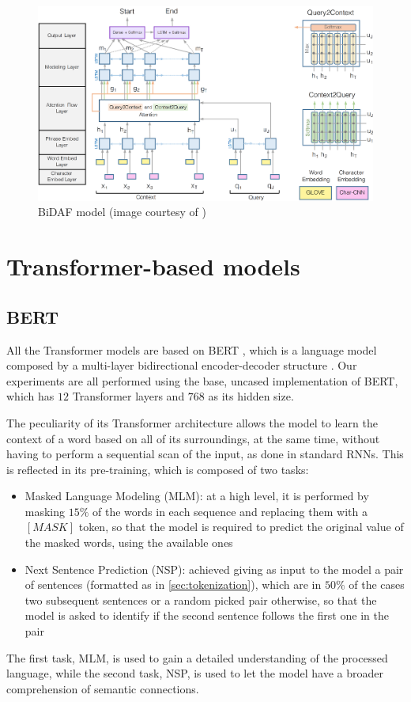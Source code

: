 \documentclass[a4paper,10pt]{report}
\begin{document}
\begin{figure}[h]
  \center
  \includegraphics[width=0.85\linewidth]{bidaf}
  \caption{BiDAF model (image courtesy of \cite{bidaf})}
  \label{fig:bidaf}
\end{figure}

\section{Transformer-based models}\label{sec:transformer-models}
\subsection{BERT}\label{subsec:bert-model}
All the Transformer models are based on BERT \cite{bert}, which is a language model composed by a multi-layer bidirectional encoder-decoder structure \cite{transformers}. Our experiments are all performed using the base, uncased implementation of BERT, which has $12$ Transformer layers and $768$ as its hidden size.

The peculiarity of its Transformer architecture allows the model to learn the context of a word based on all of its surroundings, at the same time, without having to perform a sequential scan of the input, as done in standard RNNs. This is reflected in its pre-training, which is composed of two tasks:
\begin{itemize}
  \item Masked Language Modeling (MLM): at a high level, it is performed by masking $15\%$ of the words in each sequence and replacing them with a $[MASK]$ token, so that the model is required to predict the original value of the masked words, using the available ones
  \item Next Sentence Prediction (NSP): achieved giving as input to the model a pair of sentences (formatted as in \ref{sec:tokenization}), which are in $50\%$ of the cases two subsequent sentences or a random picked pair otherwise, so that the model is asked to identify if the second sentence follows the first one in the pair
\end{itemize}
The first task, MLM, is used to gain a detailed understanding of the processed language, while the second task, NSP, is used to let the model have a broader comprehension of semantic connections.
\end{document}
